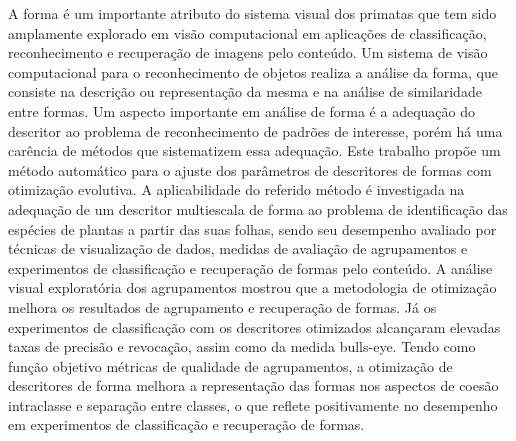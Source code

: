 A forma é um importante atributo do sistema visual dos primatas que tem sido amplamente explorado em visão computacional em aplicações de classificação, reconhecimento e recuperação de imagens pelo conteúdo. Um sistema de visão computacional para o reconhecimento de objetos realiza 
a análise da forma, que consiste na descrição ou representação da mesma e na análise 
de similaridade entre formas. Um aspecto importante em análise de forma é a adequação
do descritor ao problema de reconhecimento de padrões de interesse, porém há uma carência de métodos que sistematizem essa adequação. Este trabalho propõe um método automático para o ajuste dos parâmetros
de descritores de formas com otimização evolutiva. A aplicabilidade do referido método é investigada na adequação de um descritor multiescala de 
forma ao problema de identificação das espécies de plantas a partir das suas folhas, sendo seu desempenho avaliado por técnicas de visualização de dados, 
medidas de avaliação de agrupamentos e experimentos de classificação e recuperação de formas pelo conteúdo. A análise visual exploratória dos agrupamentos mostrou 
que a metodologia de otimização melhora os resultados de agrupamento e recuperação de formas. Já os experimentos de classificação com os descritores otimizados alcançaram elevadas
taxas de precisão e revocação, assim como da medida bulls-eye. Tendo como função objetivo métricas de qualidade de
agrupamentos, a otimização de descritores de forma melhora a representação das formas nos aspectos de coesão intraclasse e separação entre classes, o que reflete positivamente no desempenho em experimentos de classificação e recuperação de formas.
